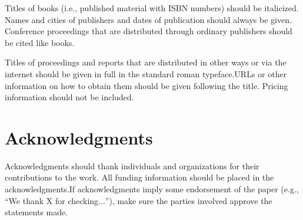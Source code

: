 \documentclass{article}
\begin{document}
Titles of books (i.e., published material with ISBN numbers) should be italicized. Names and cities of publishers and dates of publication should always be given. Conference proceedings that are distributed through ordinary publishers should be cited like books. 

Titles of proceedings and reports that are distributed in other ways or via the internet should be given in full in the standard roman typeface.URLs or other information on how to obtain them should be given following the title. Pricing information should not be included.

\section*{Acknowledgments}

Acknowledgments should thank individuals and organizations for their contributions to the work. All funding information should be placed in the acknowledgments.If acknowledgments imply some endorsement of the paper (e.g., {``}We thank X for checking\(\ldots\){''}), make sure the parties involved approve the statements made.
\end{document}

